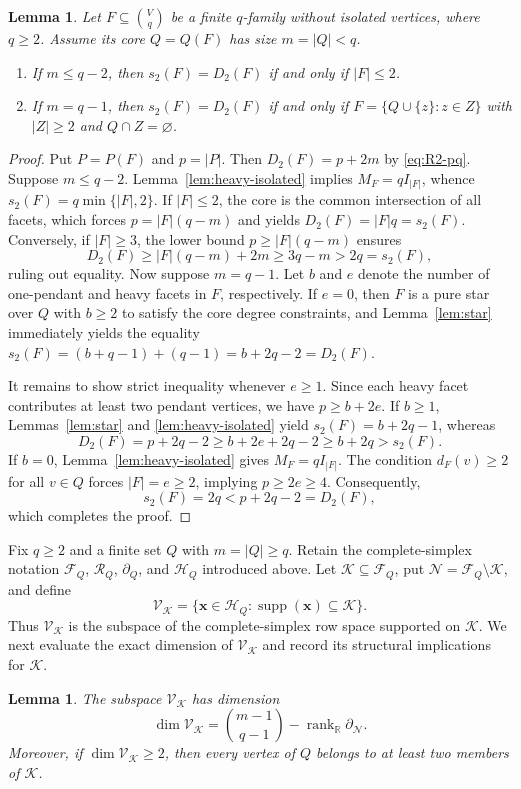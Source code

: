 \documentclass[11pt]{article}
\newtheorem{lemma}[theorem]{Lemma}
\newcommand{\rank}{\operatorname{rank}}
\newcommand{\supp}{\operatorname{supp}}
\newcommand{\bd}{\partial}
\newcommand{\calR}{\mathcal{R}}
\newcommand{\calF}{\mathcal{F}}
\newcommand{\calK}{\mathcal{K}}
\newcommand{\calN}{\mathcal{N}}
\newcommand{\scrH}{\mathscr{H}}
\newcommand{\scrV}{\mathscr{V}}
\begin{document}
	\begin{lemma}\label{lem:low-equality}
		Let \(F\subseteq\binom Vq\) be a finite \(q\)-family without isolated vertices, where \(q\ge2\). Assume its core \(Q=Q(F)\) has size \(m=|Q|<q\).
		\begin{enumerate}[label=\textup{(\roman*)}]
			\item If \(m\le q-2\), then \(s_2(F)=D_2(F)\) if and only if \(|F|\le2\).
			\item If \(m=q-1\), then \(s_2(F)=D_2(F)\) if and only if \(F=\{Q\cup\{z\}:z\in Z\}\) with \(|Z|\ge2\) and \(Q\cap Z=\varnothing\).
		\end{enumerate}
	\end{lemma}
\begin{proof}
	Put \(P=P(F)\) and \(p=|P|\). Then \(D_2(F)=p+2m\) by \eqref{eq:R2-pq}.
Suppose \(m\le q-2\). Lemma~\ref{lem:heavy-isolated} implies \(M_F=qI_{|F|}\), whence \(s_2(F) = q\min\{|F|,2\}\). If \(|F|\le 2\), the core is the common intersection of all facets, which forces \(p=|F|(q-m)\) and yields \(D_2(F)=|F|q=s_2(F)\). Conversely, if \(|F|\ge 3\), the lower bound \(p\ge|F|(q-m)\) ensures
	\[
	D_2(F) \ge |F|(q-m)+2m \ge 3q-m > 2q = s_2(F),
	\]
	ruling out equality.
Now suppose \(m=q-1\). Let \(b\) and \(e\) denote the number of one-pendant and heavy facets in \(F\), respectively. If \(e=0\), then \(F\) is a pure star over \(Q\) with \(b\ge 2\) to satisfy the core degree constraints, and Lemma~\ref{lem:star} immediately yields the equality \(s_2(F) = (b+q-1)+(q-1) = b+2q-2 = D_2(F)\).
	
	It remains to show strict inequality whenever \(e\ge 1\). Since each heavy facet contributes at least two pendant vertices, we have \(p\ge b+2e\). If \(b\ge 1\), Lemmas~\ref{lem:star} and \ref{lem:heavy-isolated} yield \(s_2(F)=b+2q-1\), whereas
	\[
	D_2(F) = p+2q-2 \ge b+2e+2q-2 \ge b+2q > s_2(F).
	\]
	If \(b=0\), Lemma~\ref{lem:heavy-isolated} gives \(M_F=qI_{|F|}\). The condition \(d_F(v)\ge 2\) for all \(v\in Q\) forces \(|F|=e\ge 2\), implying \(p\ge 2e\ge 4\). Consequently,
	\[
	s_2(F) = 2q < p+2q-2 = D_2(F),
	\]
	which completes the proof.
\end{proof}

Fix \(q\geq2\) and a finite set \(Q\) with \(m=|Q|\geq q\). Retain the
complete-simplex notation \(\calF_Q\), \(\calR_Q\), \(\bd_Q\), and
\(\scrH_Q\) introduced above. Let \(\calK\subseteq\calF_Q\), put
\(\calN=\calF_Q\setminus\calK\), and define
\[
\scrV_{\calK}
=
\{\mathbf x\in\scrH_Q:\supp(\mathbf x)\subseteq\calK\}.
\]
Thus \(\scrV_{\calK}\) is the subspace of the complete-simplex row
space supported on \(\calK\).
We next evaluate the exact dimension of $\scrV_{\calK}$ and record its structural implications for $\calK$.
\begin{lemma}\label{lem:support-rank}
The subspace \(\scrV_{\calK}\) has dimension
\[
\dim\scrV_{\calK}
=
\binom{m-1}{q-1}-\rank_{\mathbb R}\bd_{\calN}.
\]
Moreover, if \(\dim\scrV_{\calK}\geq2\), then every vertex of \(Q\)
belongs to at least two members of \(\calK\).
\end{lemma}
\end{document}
